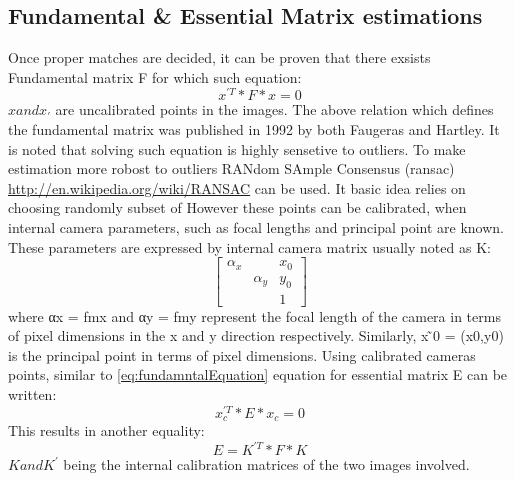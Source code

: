\subsection{Fundamental \& Essential Matrix estimations}
Once proper matches are decided, it can be proven that there exsists Fundamental matrix F for which such equation:
\begin{equation} \label{eq:fundamntalEquation}
{x}^{'T} * F * x = 0
\end{equation} 
$x and {x}_{'}$ are uncalibrated points in the images. The above relation which defines the fundamental matrix was published in 1992 by both Faugeras and Hartley. It is noted that solving such equation is highly sensetive to outliers. To make estimation more robost to outliers RANdom SAmple Consensus (\gls{ransac}) \url{http://en.wikipedia.org/wiki/RANSAC} can be used. It basic idea relies on choosing randomly subset of  However these points can be calibrated, when internal camera parameters, such as focal lengths and principal point are known. These parameters are expressed by internal camera matrix usually noted as K:
\begin{equation}
\begin{bmatrix}
\alpha _{x} &  & x_{0} \\ 
 & \alpha _{y} & y_{0}\\ 
 &  & 1
\end{bmatrix}
\end{equation}
where αx = fmx and αy = fmy represent the focal length of the camera in terms of pixel dimensions in the x and y direction respectively. Similarly, x ̃0 = (x0,y0) is the principal point in terms of pixel dimensions. 
Using calibrated cameras points, similar to \ref{eq:fundamntalEquation} equation for essential matrix E can be written:
\begin{equation} \label{eq:essentialEquation}
{x}_{c}^{'T} * E * x_{c} = 0
\end{equation} 
This results in another equality:
\begin{equation} \label{eq:essentialFundamentalRelation}
E = K^{'T} * F * K
\end{equation} 
$K and K^{'}$ being the internal calibration matrices of the two images involved.
